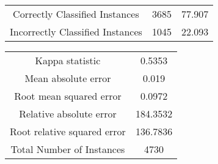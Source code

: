 \begin{itemize}
\begin{tabular}{|c|c|c|}
Correctly Classified Instances      & 3685  &            77.907  \\
Incorrectly Classified Instances    & 1045  &            22.093  \\
\end{tabular}

\begin{tabular}{|c|c|}
Kappa statistic                &         0.5353\\
Mean absolute error            &         0.019 \\
Root mean squared error        &         0.0972\\
Relative absolute error        &       184.3532 \\
Root relative squared error    &       136.7836\\
Total Number of Instances      &      4730   \\
\end{tabular}




\end{itemize}

